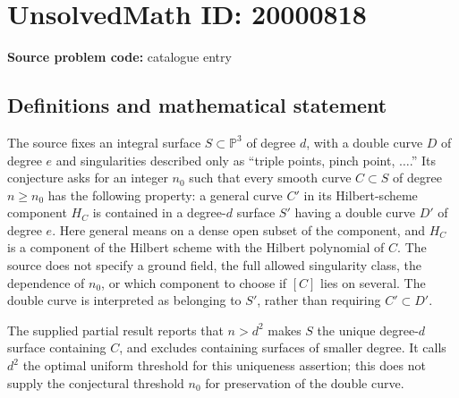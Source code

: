 \documentclass[11pt]{article}
\newcommand{\PP}{\mathbb{P}}
\begin{document}
\section*{UnsolvedMath ID: 20000818}
\textbf{Source problem code:} catalogue entry
\subsection{Definitions and mathematical statement}
The source fixes an integral surface \(S\subset\PP^3\) of degree \(d\), with a double curve \(D\) of degree \(e\) and singularities described only as ``triple points, pinch point, \(\ldots\).'' Its conjecture asks for an integer \(n_0\) such that every smooth curve \(C\subset S\) of degree \(n\ge n_0\) has the following property: a general curve \(C'\) in its Hilbert-scheme component \(H_C\) is contained in a degree-\(d\) surface \(S'\) having a double curve \(D'\) of degree \(e\). Here general means on a dense open subset of the component, and \(H_C\) is a component of the Hilbert scheme with the Hilbert polynomial of \(C\). The source does not specify a ground field, the full allowed singularity class, the dependence of \(n_0\), or which component to choose if \([C]\) lies on several. The double curve is interpreted as belonging to \(S'\), rather than requiring \(C'\subset D'\).

The supplied partial result reports that \(n>d^2\) makes \(S\) the unique degree-\(d\) surface containing \(C\), and excludes containing surfaces of smaller degree. It calls \(d^2\) the optimal uniform threshold for this uniqueness assertion; this does not supply the conjectural threshold \(n_0\) for preservation of the double curve.
\end{document}

